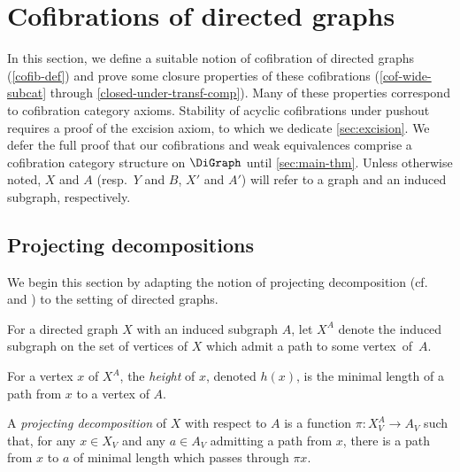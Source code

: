 \section{Cofibrations of directed graphs} \label{sec:cofibs}

In this section, we define a suitable notion of cofibration of directed graphs (\cref{cofib-def}) and prove some closure properties of these cofibrations (\cref{cof-wide-subcat} through \cref{closed-under-transf-comp}). 
Many of these properties correspond to cofibration category axioms.
Stability of acyclic cofibrations under pushout requires a proof of the excision axiom, to which we dedicate \cref{sec:excision}.
We defer the full proof that our cofibrations and weak equivalences comprise a cofibration category structure on $\DiGraph$ until \cref{sec:main-thm}. 
Unless otherwise noted, $X$ and $A$ (resp.~$Y$ and $B$, $X'$ and $A'$) will refer to a graph and an induced subgraph, respectively.

\subsection{Projecting decompositions}

We begin this section by adapting the notion of projecting decomposition (cf.~\cite[Def.~4.6]{leinster:magnitude-graph} and \cite[Def.~26]{hepworth-willerton}) to the setting of directed graphs.

\begin{defi}
For a directed graph $X$ with an induced subgraph $A$, let $X^A$ denote the induced subgraph on the set of vertices of $X$ which admit a path to some vertex~of~$A$.     
\end{defi}

\begin{defi}
For a vertex $x$ of $X^A$, the \emph{height} of $x$, denoted $h(x)$, is the minimal length of a path from $x$ to a vertex of $A$.
\end{defi}

\begin{defi}\label{proj-decomp-def}
A \emph{projecting decomposition} of $X$ with respect to $A$ is a function $\pi \colon X_{V}^A \to A_V$ such that, for any $x \in X_V$ and any $a \in A_V$ admitting a path from $x$, there is a path from $x$ to $a$ of minimal length which passes through $\pi x$.
\end{defi}

